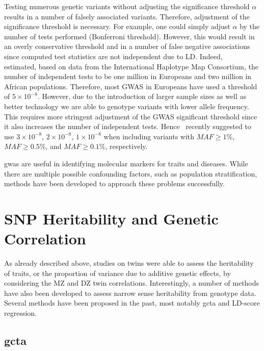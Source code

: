 Testing numerous genetic variants without adjusting the significance threshold $\alpha$ results in a number of falsely associated variants.
Therefore, adjustment of the significance threshold is necessary.
For example, one could simply adjust $\alpha$ by the number of tests performed (Bonferroni threshold).
However, this would result in an overly conservative threshold and in a number of false negative associations~\cite{Benjamini1995} since computed test statistics are not independent due to LD\@.
Indeed, ~\citet{Peer2008} estimated, based on data from the International Haplotype Map Consortium, the number of independent tests to be one million in Europeans and two million in African populations.
Therefore, most GWAS in Europeans have used a threshold of $5\times 10^{-8}$.
However, due to the introduction of larger sample sizes as well as better technology we are able to genotype variants with lower allele frequency.
This requires more stringent adjustment of the GWAS significant threshold since it also increases the number of independent tests.
Hence~\citet{Fadista2016} recently suggested to use $3\times10^{-8}$, $2\times10^{-8}$, $1\times10^{-8}$ when including variants with $MAF\ge1\%$, $MAF\ge0.5\%$, and $MAF\ge0.1\%$, respectively.

\acrshort{gwas} are useful in identifying molecular markers for traits and diseases.
While there are multiple possible confounding factors, such as population stratification, methods have been developed to approach these problems successfully.


\section{SNP Heritability and Genetic Correlation}
\label{sec:heritability_and_genetic_correlation}

As already described above, studies on twins were able to assess the heritability of traits, or the proportion of variance due to additive genetic effects, by considering the MZ and DZ twin correlations.
Interestingly, a number of methods have also been developed to assess narrow sense heritability from genotype data.
Several methods have been proposed in the past, most notably \acrfull{gcta} and LD-score regression.

\subsection{\acrfull{gcta}}
\label{sub:gcta}

